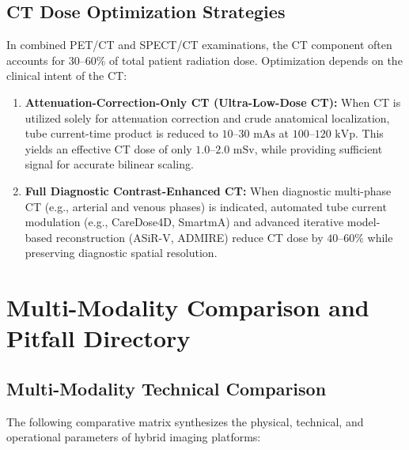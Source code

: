 \documentclass[11pt,a4paper]{article}
\begin{document}
\subsection{CT Dose Optimization Strategies}
In combined PET/CT and SPECT/CT examinations, the CT component often accounts for $30\text{--}60\%$ of total patient radiation dose. Optimization depends on the clinical intent of the CT:
\begin{enumerate}
    \item \textbf{Attenuation-Correction-Only CT (Ultra-Low-Dose CT):} When CT is utilized solely for attenuation correction and crude anatomical localization, tube current-time product is reduced to $10\text{--}30\text{ mAs}$ at $100\text{--}120\text{ kVp}$. This yields an effective CT dose of only $1.0\text{--}2.0\text{ mSv}$, while providing sufficient signal for accurate bilinear scaling.
    \item \textbf{Full Diagnostic Contrast-Enhanced CT:} When diagnostic multi-phase CT (e.g., arterial and venous phases) is indicated, automated tube current modulation (e.g., CareDose4D, SmartmA) and advanced iterative model-based reconstruction (ASiR-V, ADMIRE) reduce CT dose by $40\text{--}60\%$ while preserving diagnostic spatial resolution.
\end{enumerate}

\section{Multi-Modality Comparison and Pitfall Directory}

\subsection{Multi-Modality Technical Comparison}
The following comparative matrix synthesizes the physical, technical, and operational parameters of hybrid imaging platforms:
\end{document}
